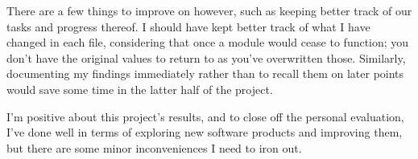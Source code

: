 \vspace{5mm}

There are a few things to improve on however, such as keeping better track of our tasks and progress thereof. I should have kept better track of what I have changed in each file, considering that once a module would cease to function; you don't have the original values to return to as you've overwritten those. Similarly, documenting my findings immediately rather than to recall them on later points would save some time in the latter half of the project.

\vspace{5mm}

I'm positive about this project's results, and to close off the personal evaluation, I've done well in terms of exploring new software products and improving them, but there are some minor inconveniences I need to iron out.

\newpage